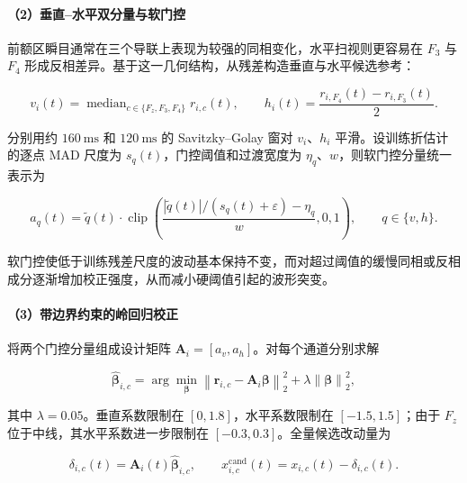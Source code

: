 \documentclass[a4paper,zihao=-4,linespread=1]{ctexart}
\numberwithin{figure}{section}       %
\begin{document}
\paragraph{（2）垂直--水平双分量与软门控}

前额区瞬目通常在三个导联上表现为较强的同相变化，水平扫视则更容易在 $F_3$ 与 $F_4$ 形成反相差异。基于这一几何结构，从残差构造垂直与水平候选参考：

\begin{equation}
    v_i(t)=\mathop{\mathrm{median}}_{c\in\{F_z,F_3,F_4\}}r_{i,c}(t),
    \qquad
    h_i(t)=\frac{r_{i,F_4}(t)-r_{i,F_3}(t)}{2}.
    \label{eq:q1_components}
\end{equation}

分别用约 $160~\mathrm{ms}$ 和 $120~\mathrm{ms}$ 的 Savitzky--Golay 窗对 $v_i$、$h_i$ 平滑。设训练折估计的逐点 MAD 尺度为 $s_q(t)$，门控阈值和过渡宽度为 $\eta_q$、$w$，则软门控分量统一表示为

\begin{equation}
    a_q(t)=\tilde q(t)\cdot
    \operatorname{clip}\!\left(
    \frac{|\tilde q(t)|/(s_q(t)+\varepsilon)-\eta_q}{w},0,1
    \right),
    \qquad q\in\{v,h\}.
    \label{eq:q1_gate}
\end{equation}

软门控使低于训练残差尺度的波动基本保持不变，而对超过阈值的缓慢同相或反相成分逐渐增加校正强度，从而减小硬阈值引起的波形突变。

\paragraph{（3）带边界约束的岭回归校正}

将两个门控分量组成设计矩阵 $\mathbf A_i=[a_v,a_h]$。对每个通道分别求解

\begin{equation}
    \hat{\boldsymbol\beta}_{i,c}=
    \arg\min_{\boldsymbol\beta}
    \left\|\mathbf r_{i,c}-\mathbf A_i\boldsymbol\beta\right\|_2^2
    +\lambda\left\|\boldsymbol\beta\right\|_2^2,
    \label{eq:q1_ridge}
\end{equation}

其中 $\lambda=0.05$。垂直系数限制在 $[0,1.8]$，水平系数限制在 $[-1.5,1.5]$；由于 $F_z$ 位于中线，其水平系数进一步限制在 $[-0.3,0.3]$。全量候选改动量为

\begin{equation}
    \delta_{i,c}(t)=\mathbf A_i(t)\hat{\boldsymbol\beta}_{i,c},
    \qquad x^{\mathrm{cand}}_{i,c}(t)=x_{i,c}(t)-\delta_{i,c}(t).
    \label{eq:q1_candidate}
\end{equation}
\end{document}
